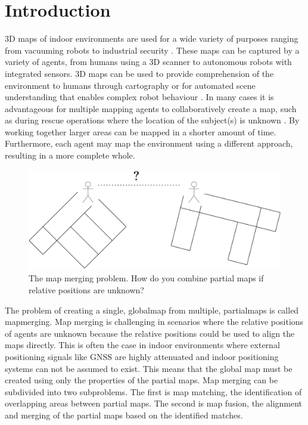 
\section{Introduction}

3D \gls{map}s of indoor environments are used for a wide variety of purposes ranging from vacuuming robots to industrial security \citep{hermann_design_2016}. These maps can be captured by a variety of \gls{agent}s, from humans using a 3D scanner to autonomous robots with integrated sensors. 3D maps can be used to provide comprehension of the environment to humans through cartography or for automated scene understanding that enables complex robot behaviour \citep{chen_indoor_2020,wang_safe_2019}. In many cases it is advantageous for multiple mapping agents to collaboratively create a map, such as during rescue operations where the location of the subject(s) is unknown \citep{queralta_collaborative_2020}. By working together larger areas can be mapped in a shorter amount of time. Furthermore, each agent may map the environment using a different approach, resulting in a more complete whole.

\begin{figure}[h]
    \centering
    \includegraphics*[width=.7\textwidth]{./fig/overview_diagrams-Page-4.drawio.pdf}
    \caption{The map merging problem. How do you combine partial maps if relative positions are unknown?}
    \label{fig:map_merging}
\end{figure}

The problem of creating a single, \gls{globalmap} from multiple, \gls{partialmap}s is called \gls{mapmerging}. Map merging is challenging in scenarios where the relative positions of agents are unknown because the relative positions could be used to align the maps directly. This is often the case in indoor environments where external positioning signals like GNSS are highly attenuated and indoor positioning systems can not be assumed to exist. This means that the global map must be created using only the properties of the partial maps. Map merging can be subdivided into two subproblems. The first is map matching, the identification of overlapping areas between partial maps. The second is map fusion, the alignment and merging of the partial maps based on the identified matches. 

